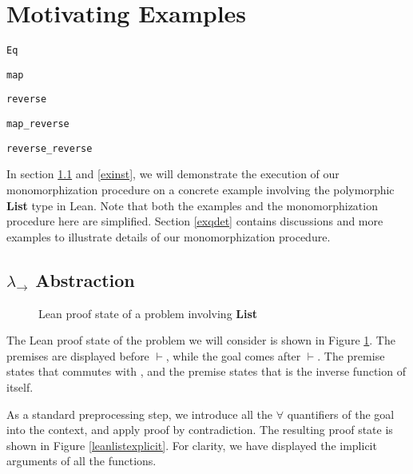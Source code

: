 \section{Motivating Examples}

\begin{lrbox}{\vEq} {\color{hypcolor} \verb|Eq|} \end{lrbox}
\begin{lrbox}{\vmap} {\color{hypcolor} \verb|map|} \end{lrbox}
\begin{lrbox}{\vrev} {\color{hypcolor} \verb|reverse|} \end{lrbox}
\begin{lrbox}{\vmaprev} {\color{hypcolor} \verb|map_reverse|} \end{lrbox}
\begin{lrbox}{\vrevrev} {\color{hypcolor} \verb|reverse_reverse|} \end{lrbox}

In section \ref{exabst} and \ref{exinst}, we will demonstrate the execution of our monomorphization procedure on a
concrete example involving the polymorphic \textbf{List} type in Lean. Note that both
the examples and the monomorphization procedure here are simplified. Section \ref{exqdet} contains
discussions and more examples to illustrate details of our monomorphization procedure.

\subsection{$\lambda_\to$ Abstraction} \label{exabst}

\begin{figure}
  \begin{CenteredBox}
    
  \end{CenteredBox}
  \caption{Lean proof state of a problem involving \textbf{List}} \label{leanlistpretty}
\end{figure}

\noindent The Lean proof state of the problem we will consider is shown in Figure \ref{leanlistpretty}.
The premises are displayed before $\vdash$, while the goal comes after $\vdash$. The premise
\usebox{\vmaprev} states that \usebox{\vmap} commutes with \usebox{\vrev}, and the premise
\usebox{\vrevrev} states that \usebox{\vrev} is the inverse function of itself.

\noindent As a standard preprocessing step, we introduce all the $\forall$ quantifiers
of the goal into the context, and apply proof by contradiction. The resulting proof state
is shown in Figure \ref{leanlistexplicit}.
For clarity, we have displayed the implicit arguments of all the functions.

